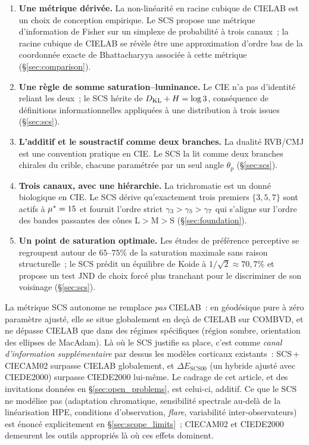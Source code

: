 \documentclass[12pt,a4paper]{article}
\begin{document}
\begin{enumerate}[nosep]
\item \textbf{Une m\'etrique d\'eriv\'ee.} La non-lin\'earit\'e en
  racine cubique de CIELAB est un choix de conception empirique. Le
  SCS propose une m\'etrique d'information de Fisher sur un simplexe
  de probabilit\'e \`a trois canaux~; la racine cubique de CIELAB se
  r\'ev\`ele \^etre une approximation d'ordre bas de la coordonn\'ee
  exacte de Bhattacharyya associ\'ee \`a cette m\'etrique
  (\S\ref{sec:comparison}).
\item \textbf{Une r\`egle de somme saturation--luminance.} Le CIE n'a
  pas d'identit\'e reliant les deux~; le SCS h\'erite de
  $D_{\mathrm{KL}} + H = \log 3$, cons\'equence de d\'efinitions
  informationnelles appliqu\'ees \`a une distribution \`a trois issues
  (\S\ref{sec:scs}).
\item \textbf{L'additif et le soustractif comme deux branches.} La
  dualit\'e RVB/CMJ est une convention pratique en CIE. Le SCS la lit
  comme deux branches chirales du crible, chacune param\'etr\'ee par
  un seul angle $\theta_p$ (\S\ref{sec:scs}).
\item \textbf{Trois canaux, avec une hi\'erarchie.} La trichromatie est
  un donn\'e biologique en CIE. Le SCS d\'erive qu'exactement trois
  premiers $\{3, 5, 7\}$ sont actifs \`a ${\mu^{*}} = 15$ et fournit
  l'ordre strict $\gamma_{3} > \gamma_{5} > \gamma_{7}$ qui s'aligne sur
  l'ordre des bandes passantes des c\^ones L$>$M$>$S
  (\S\ref{sec:foundation}).
\item \textbf{Un point de saturation optimale.} Les \'etudes de
  pr\'ef\'erence perceptive se regroupent autour de $65$--$75\%$ de la
  saturation maximale sans raison structurelle~; le SCS pr\'edit un
  \'equilibre de Koide \`a $1/\sqrt{2} \approx 70{,}7\%$ et propose un
  test JND de choix forc\'e plus tranchant pour le discriminer de son
  voisinage (\S\ref{sec:scs}).
\end{enumerate}

La m\'etrique SCS autonome ne remplace \emph{pas} CIELAB~: en
g\'eod\'esique pure \`a z\'ero param\`etre ajust\'e, elle se situe
globalement en de\c{c}\`a de CIELAB sur COMBVD, et ne d\'epasse
CIELAB que dans des r\'egimes sp\'ecifiques (r\'egion sombre,
orientation des ellipses de MacAdam). L\`a o\`u le SCS justifie sa
place, c'est comme \emph{canal d'information suppl\'ementaire} par
dessus les mod\`eles corticaux existants~: SCS\,+\,CIECAM02 surpasse
CIELAB globalement, et $\Delta E_{\mathrm{SCS00}}$ (un hybride
ajust\'e avec CIEDE2000) surpasse CIEDE2000 lui-m\^eme. Le cadrage de
cet article, et des invitations donn\'ees en
\S\ref{sec:open_problems}, est celui-ci, additif. Ce que le SCS ne
mod\'elise pas (adaptation chromatique, sensibilit\'e spectrale
au-del\`a de la lin\'earisation HPE, conditions d'observation,
\emph{flare}, variabilit\'e inter-observateurs) est \'enonc\'e
explicitement en \S\ref{sec:scope_limits}~; CIECAM02 et CIEDE2000
demeurent les outils appropri\'es l\`a o\`u ces effets dominent.
\end{document}
